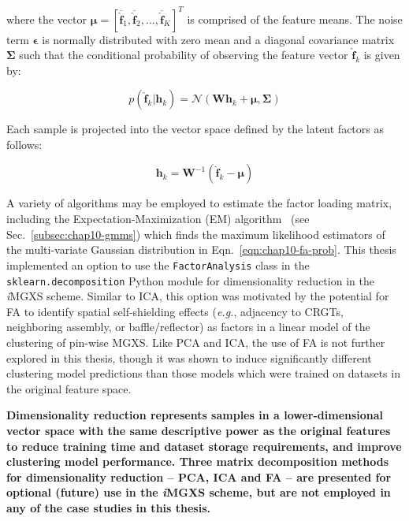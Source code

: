 \noindent where the vector $\boldsymbol{\mu} = \left[\overline{\boldsymbol{\hat{f}}}_{1}, \overline{\boldsymbol{\hat{f}}}_{2}, \dots, \overline{\boldsymbol{\hat{f}}}_{K}\right]^{T} $ is comprised of the feature means. The noise term $\boldsymbol{\epsilon}$ is normally distributed with zero mean and a diagonal covariance matrix $\boldsymbol{\Sigma}$ such that the conditional probability of observing the feature vector $\boldsymbol{\hat{f}}_{k}$ is given by:

\begin{equation}
\label{eqn:chap10-fa-prob}
p\left(\boldsymbol{\hat{f}}_{k}|\boldsymbol{h}_{k}\right) = \mathcal{N}\left(\boldsymbol{W}\boldsymbol{h}_{k} + \boldsymbol{\mu}, \boldsymbol{\Sigma}\right)
\end{equation}

\noindent Each sample is projected into the vector space defined by the latent factors as follows:

\begin{equation}
\label{eqn:chap10-fa-inverse}
\boldsymbol{h}_{k} = \boldsymbol{W}^{-1}\left(\boldsymbol{\hat{f}}_{k} - \boldsymbol{\mu}\right)
\end{equation}

A variety of algorithms may be employed to estimate the factor loading matrix, including the Expectation-Maximization (EM) algorithm~\cite{dempster1977em} (see Sec.~\ref{subsec:chap10-gmms}) which finds the maximum likelihood estimators of the multi-variate Gaussian distribution in Eqn.~\ref{eqn:chap10-fa-prob}. This thesis implemented an option to use the \texttt{FactorAnalysis} class in the \texttt{sklearn.decomposition} Python module for dimensionality reduction in the \textit{i}\ac{MGXS} scheme. Similar to ICA, this option was motivated by the potential for FA to identify spatial self-shielding effects (\textit{e.g.}, adjacency to \acp{CRGT}, neighboring assembly, or baffle/reflector) as factors in a linear model of the clustering of pin-wise \ac{MGXS}. Like PCA and ICA, the use of FA is not further explored in this thesis, though it was shown to induce significantly different clustering model predictions than those models which were trained on datasets in the original feature space.

\clearpage

\begin{emphbox}
\textbf{Dimensionality reduction represents samples in a lower-dimensional vector space with the same descriptive power as the original features to reduce training time and dataset storage requirements, and improve clustering model performance. Three matrix decomposition methods for dimensionality reduction -- PCA, ICA and FA -- are presented for optional (future) use in the \textit{i}\ac{MGXS} scheme, but are not employed in any of the case studies in this thesis.}
\end{emphbox}

